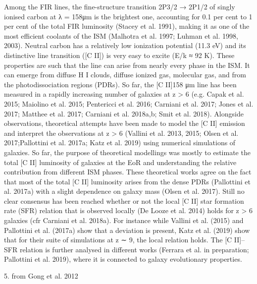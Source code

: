 Among the FIR lines, the fine-structure transition 2P3/2 →
2P1/2 of singly ionised carbon at λ = 158μm is the brightest one,
accounting for 0.1 per cent to 1 per cent of the total FIR luminosity
(Stacey et al. 1991), making it as one of the most efficient coolants
of the ISM (Malhotra et al. 1997; Luhman et al. 1998, 2003).
Neutral carbon has a relatively low ionization potential (11.3 eV)
and its distinctive line transition ([C II]) is very easy to excite
(E/k ≈ 92 K). These properties are such that the line can arise from
nearly every phase in the ISM. It can emerge from diffuse H I clouds,
diffuse ionized gas, molecular gas, and from the photodissociation
regions (PDRs). So far, the [C II]158 μm line has been measured in
a rapidly increasing number of galaxies at z > 6 (e.g. Capak et al.
2015; Maiolino et al. 2015; Pentericci et al. 2016; Carniani et al.
2017; Jones et al. 2017; Matthee et al. 2017; Carniani et al. 2018a,b;
Smit et al. 2018).
Alongside observations, theoretical attempts have been made to
model the [C II] emission and interpret the observations at z > 6
(Vallini et al. 2013, 2015; Olsen et al. 2017;Pallottini et al. 2017a;
Katz et al. 2019) using numerical simulations of galaxies. So far,
the purpose of theoretical modellings was mostly to estimate the
total [C II] luminosity of galaxies at the EoR and understanding the
relative contribution from different ISM phases. These theoretical
works agree on the fact that most of the total [C II] luminosity
arises from the dense PDRs (Pallottini et al. 2017a) with a slight
dependence on galaxy mass (Olsen et al. 2017). Still no clear
consensus has been reached whether or not the local [C II] star
formation rate (SFR) relation that is observed locally (De Looze
et al. 2014) holds for z > 6 galaxies (cfr Carniani et al. 2018a).
For instance while Vallini et al. (2015) and Pallottini et al. (2017a)
show that a deviation is present, Katz et al. (2019) show that for
their suite of simulations at z ∼ 9, the local relation holds. The
[C II]–SFR relation is further analysed in different works (Ferrara
et al. in preparation; Pallottini et al. 2019), where it is connected to
galaxy evolutionary properties.


5. from Gong et al. 2012

